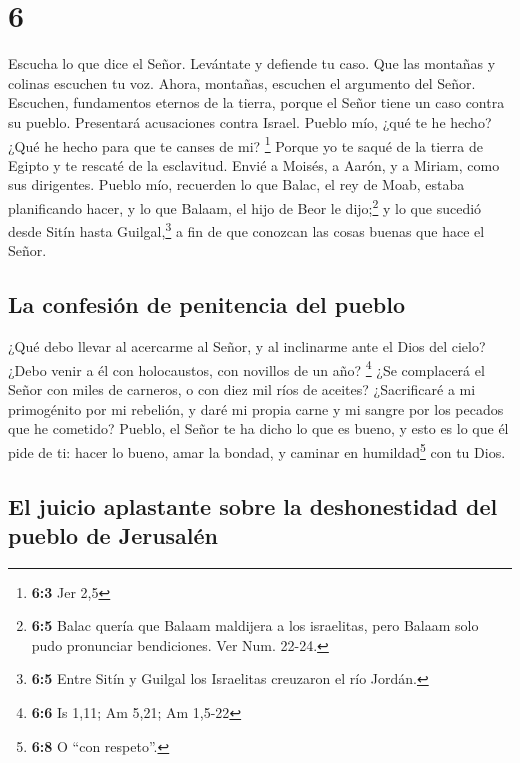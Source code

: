 \hypertarget{section-5}{%
\section{6}\label{section-5}}

 Escucha lo que dice el Señor. Levántate y defiende tu
caso. Que las montañas y colinas escuchen tu voz.  Ahora,
montañas, escuchen el argumento del Señor. Escuchen, fundamentos eternos
de la tierra, porque el Señor tiene un caso contra su pueblo. Presentará
acusaciones contra Israel.  Pueblo mío, ¿qué te he hecho?
¿Qué he hecho para que te canses de mi? \footnote{\textbf{6:3} Jer 2,5}
 Porque yo te saqué de la tierra de Egipto y te rescaté de
la esclavitud. Envié a Moisés, a Aarón, y a Miriam, como sus dirigentes.
 Pueblo mío, recuerden lo que Balac, el rey de Moab,
estaba planificando hacer, y lo que Balaam, el hijo de Beor le
dijo;\footnote{\textbf{6:5} Balac quería que Balaam maldijera a los
  israelitas, pero Balaam solo pudo pronunciar bendiciones. Ver Num.
  22-24.} y lo que sucedió desde Sitín hasta Guilgal,\footnote{\textbf{6:5}
  Entre Sitín y Guilgal los Israelitas creuzaron el río Jordán.} a fin
de que conozcan las cosas buenas que hace el Señor.

\hypertarget{la-confesiuxf3n-de-penitencia-del-pueblo}{%
\subsection{La confesión de penitencia del
pueblo}\label{la-confesiuxf3n-de-penitencia-del-pueblo}}

 ¿Qué debo llevar al acercarme al Señor, y al inclinarme
ante el Dios del cielo? ¿Debo venir a él con holocaustos, con novillos
de un año? \footnote{\textbf{6:6} Is 1,11; Am 5,21; Am 1,5-22}
 ¿Se complacerá el Señor con miles de carneros, o con diez
mil ríos de aceites? ¿Sacrificaré a mi primogénito por mi rebelión, y
daré mi propia carne y mi sangre por los pecados que he cometido?
 Pueblo, el Señor te ha dicho lo que es bueno, y esto es
lo que él pide de ti: hacer lo bueno, amar la bondad, y caminar en
humildad\footnote{\textbf{6:8} O ``con respeto''.} con tu Dios.

\hypertarget{el-juicio-aplastante-sobre-la-deshonestidad-del-pueblo-de-jerusaluxe9n}{%
\subsection{El juicio aplastante sobre la deshonestidad del pueblo de
Jerusalén}\label{el-juicio-aplastante-sobre-la-deshonestidad-del-pueblo-de-jerusaluxe9n}}

